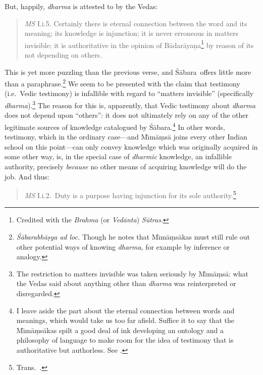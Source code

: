 \documentclass[11pt,letterpaper,oneside]{amsart}
\newcommand{\e}{\emph}
\newenvironment{squote}{\begin{quote}\sf\small}{\rm\end{quote}} %
\newcommand{\sabara}{\'S\=abara}
\begin{document}
But, happily, \emph{dharma} is attested to by the Vedas:\begin{squote}\emph{MS} I.i.5. Certainly there is eternal connection between the word and its meaning; its knowledge is injunction; it is never erroneous in matters invisible; it is authoritative in the opinion of B\=adar\=aya\d na\footnote{Credited with the \emph{Brahma} (or \emph{Ved\=anta}) \emph{S\=utras}.} by reason of its not depending on others.\end{squote}This is yet more puzzling than the previous verse, and \sabara\ offers little more than a paraphrase.\footnote{\emph{\'S\=abarabh\=a\d sya} \emph{ad loc.} Though he notes that M\={\i}m\=a\d ms\=akas must still rule out other potential ways of knowing \emph{dharma}, for example by inference or analogy.} We seem to be presented with the claim that testimony (i.e.\ Vedic testimony) is infallible with regard to ``matters invisible'' (specifically \emph{dharma}).\footnote{The restriction to matters invisible was taken seriously by M\={\i}m\=a\d ms\=a: what the Vedas said about anything other than \emph{dharma} was reinterpreted or disregarded.\label{invisiblenote}} The reason for this is, apparently, that Vedic testimony about \emph{dharma} does not depend upon ``others'': it does not ultimately rely on any of the other legitimate sources of knowledge catalogued by \small\'S\normalsize \=abara.\footnote{I leave aside the part about the eternal connection between words and meanings, which would take us too far afield. Suffice it to say that the M\={\i}m\=a\d ms\=akas spilt a good deal of ink developing an ontology and a philosophy of language to make room for the idea of testimony that is authoritative but authorless. See \citet{tabereternality}.} In other words, testimony, which in the ordinary case---and M\={\i}m\=a\d ms\=a joins every other Indian school on this point---can only convey knowledge which was originally acquired in some other way, is, in the special case of \emph{dharmic} knowledge, an infallible authority, precisely \emph{because} no other means of acquiring knowledge will do the job. And thus:\begin{squote}\e{MS} I.i.2.\ Duty is a purpose having injunction for its sole authority.\footnote{Trans.\ \citet{jha1907skb}.}\end{squote}
\end{document}

